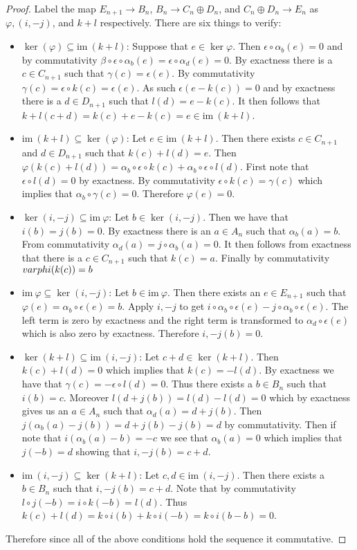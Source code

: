 \documentclass[10pt]{article}
\newcommand{\img}{\text{im}\ }
\theoremstyle{plain}
\theoremstyle{remark}
\begin{document}
\begin{proof}
  Label the map $E_{n+1}\rightarrow B_n$, $B_n\rightarrow C_n\oplus D_n$, and $C_n\oplus D_n\rightarrow E_n$ as
  $\varphi,(i,-j)$, and $k+l$ respectively. There are six things to verify:
  \begin{itemize}
  \item$\ker(\varphi)\subseteq\img(k+l)$: Suppose that $e\in\ker\varphi$. Then $\epsilon\circ\alpha_b(e)=0$
    and by commutativity $\beta\circ\epsilon\circ\alpha_b(e)=\epsilon\circ\alpha_d(e)=0$. By exactness there is
    a $c\in C_{n+1}$ such that $\gamma(c)=\epsilon(e)$. By commutativity $\gamma(c)=\epsilon\circ k(c)=\epsilon(e)$.
    As such $\epsilon(e-k(c))=0$ and by exactness there is a $d\in D_{n+1}$ such that
    $l(d)=e-k(c)$. It then follows that $k+l(c+d)=k(c)+e-k(c)=e\in\img(k+l)$.
  \item$\img(k+l)\subseteq\ker(\varphi)$: Let $e\in\img(k+l)$. Then there exists $c\in C_{n+1}$ and
    $d\in D_{n+1}$ such that $k(c)+l(d)=e$. Then $\varphi(k(c)+l(d))=\alpha_b\circ\epsilon\circ k(c)+\alpha_b\circ\epsilon\circ l(d)$.
    First note that $\epsilon\circ l(d)=0$ by exactness. By commutativity $\epsilon\circ k(c)=\gamma(c)$ which
    implies that $\alpha_b\circ\gamma(c)=0$. Therefore $\varphi(e)=0$.
  \item$\ker(i,-j)\subseteq\img\varphi$: Let $b\in\ker(i,-j)$. Then we have that $i(b)=j(b)=0$. By exactness
    there is an $a\in A_n$ such that $\alpha_b(a)=b$. From commutativity $\alpha_d(a)=j\circ\alpha_b(a)=0$. It
    then follows from exactness that there is a $c\in C_{n+1}$ such that $k(c)=a$. Finally
    by commutativity $\\varphi (k(c))=b$
  \item$\img\varphi\subseteq\ker(i,-j)$: Let $b\in\img\varphi $. Then there exists an $e\in E_{n+1}$ such that
    $\varphi(e)=\alpha_b\circ\epsilon(e)=b$. Apply $i,-j$ to get $i\circ\alpha_b\circ\epsilon(e)-j\circ\alpha_b\circ\epsilon(e)$. The left term
    is zero by exactness and the right term is transformed to $\alpha_d\circ\epsilon(e)$ which
    is also zero by exactness. Therefore $i,-j(b)=0$.
  \item$\ker(k+l)\subseteq\img(i,-j)$: Let $c+d\in\ker(k+l)$. Then $k(c)+l(d)=0$ which implies
    that $k(c)=-l(d)$. By exactness we have that $\gamma(c)=-\epsilon\circ l(d)=0$. Thus there
    exists a $b\in B_n$ such that $i(b)=c$. Moreover $l(d+j(b))=l(d)-l(d)=0$ which
    by exactness gives us an $a\in A_n$ such that $\alpha_d(a)=d+j(b)$. Then
    $j(\alpha_b(a)-j(b))=d+j(b)-j(b)=d$ by commutativity. Then if note that
    $i(\alpha_b(a)-b)=-c$ we see that $\alpha_b(a)=0$ which implies that $j(-b)=d$
    showing that $i,-j(b)=c+d$.
  \item$\img(i,-j)\subseteq\ker(k+l)$: Let $c,d\in\img(i,-j)$. Then there exists
    a $b\in B_n$ such that $i,-j(b)=c+d$. Note that by commutativity
    $l\circ j(-b)=i\circ k(-b)=l(d)$. Thus $k(c)+l(d)=k\circ i(b)+k\circ i(-b)=k\circ i(b-b)=0$.
  \end{itemize}

  Therefore since all of the above conditions hold the sequence it commutative.
\end{proof}
\end{document}
